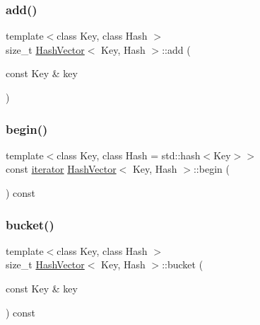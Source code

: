 \subsubsection{\texorpdfstring{add()}{add()}}
{\footnotesize\ttfamily template$<$class Key, class Hash $>$ \\
size\+\_\+t \mbox{\hyperlink{class_hash_vector}{Hash\+Vector}}$<$ Key, Hash $>$\+::add (\begin{DoxyParamCaption}\item[{const Key \&}]{key }\end{DoxyParamCaption})}

\mbox{\label{class_hash_vector_af63968bed76e89e08246154e4c233dc1}} 
\subsubsection{\texorpdfstring{begin()}{begin()}}
{\footnotesize\ttfamily template$<$class Key, class Hash = std\+::hash$<$\+Key$>$$>$ \\
const \mbox{\hyperlink{class_hash_vector_1_1iterator}{iterator}} \mbox{\hyperlink{class_hash_vector}{Hash\+Vector}}$<$ Key, Hash $>$\+::begin (\begin{DoxyParamCaption}{ }\end{DoxyParamCaption}) const\hspace{0.3cm}{\ttfamily [inline]}}

\mbox{\label{class_hash_vector_af296ee20435340b6cd0876e154779ecf}} 
\subsubsection{\texorpdfstring{bucket()}{bucket()}}
{\footnotesize\ttfamily template$<$class Key, class Hash $>$ \\
size\+\_\+t \mbox{\hyperlink{class_hash_vector}{Hash\+Vector}}$<$ Key, Hash $>$\+::bucket (\begin{DoxyParamCaption}\item[{const Key \&}]{key }\end{DoxyParamCaption}) const}

\mbox{\label{class_hash_vector_acff408f0ec8a936eeeccdc12d93e10d9}} 
